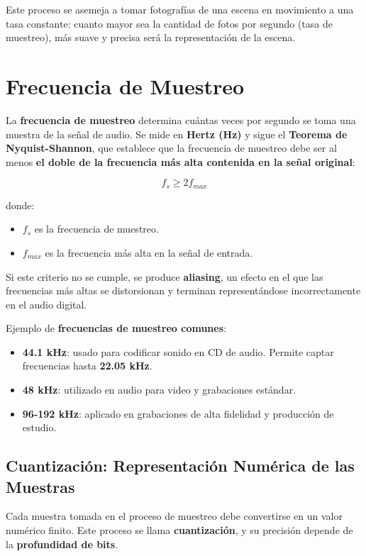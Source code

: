 Este proceso se asemeja a tomar fotografías de una escena en movimiento a una tasa constante: cuanto mayor sea la cantidad de fotos por segundo (tasa de muestreo), más suave y precisa será la representación de la escena.

\section{Frecuencia de Muestreo}

La \textbf{frecuencia de muestreo} determina cuántas veces por segundo se toma una muestra de la señal de audio. Se mide en \textbf{Hertz (Hz)} y sigue el \textbf{Teorema de Nyquist-Shannon}, que establece que la frecuencia de muestreo debe ser al menos \textbf{el doble de la frecuencia más alta contenida en la señal original}:

\begin{equation}
    f_s \geq 2 f_{max}
\end{equation}

donde:
\begin{itemize}
    \item $f_s$ es la frecuencia de muestreo.
    \item $f_{max}$ es la frecuencia más alta en la señal de entrada.
\end{itemize}

Si este criterio no se cumple, se produce \textbf{aliasing}, un efecto en el que las frecuencias más altas se distorsionan y terminan representándose incorrectamente en el audio digital.

Ejemplo de \textbf{frecuencias de muestreo comunes}:
\begin{itemize}
    \item \textbf{44.1 kHz}: usado para codificar sonido en CD de audio. Permite captar frecuencias hasta \textbf{22.05 kHz}.
    \item \textbf{48 kHz}: utilizado en audio para video y grabaciones estándar.
    \item \textbf{96-192 kHz}: aplicado en grabaciones de alta fidelidad y producción de estudio.
\end{itemize}

\subsection{Cuantización: Representación Numérica de las Muestras}

Cada muestra tomada en el proceso de muestreo debe convertirse en un valor numérico finito. Este proceso se llama \textbf{cuantización}, y su precisión depende de la \textbf{profundidad de bits}.

